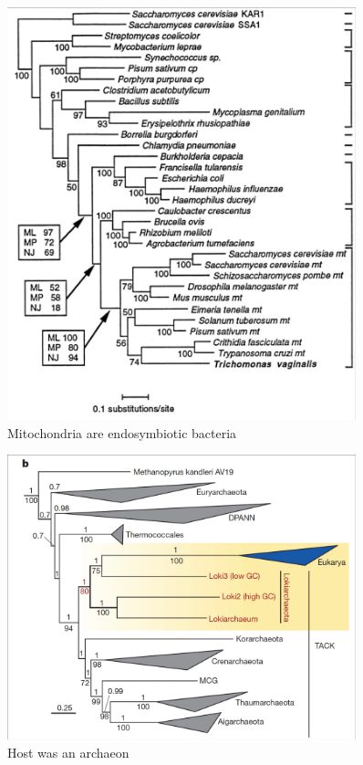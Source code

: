 \documentclass[]{article}
\begin{document}
\begin{figure}[H]
	\caption{Mitochondria are endosymbiotic bacteria}
	\label{fig:Mitochondria:are:endosymbiotic:bacteria}
	\includegraphics[width=0.9\textwidth]{MitochondriaEndosymbiotic}
\end{figure}

\begin{figure}
	\caption{Host was an archaeon}
	\label{fig:host:archaeon}
	\includegraphics[width=0.9\textwidth]{HostArchaeon}
\end{figure}
\end{document}
